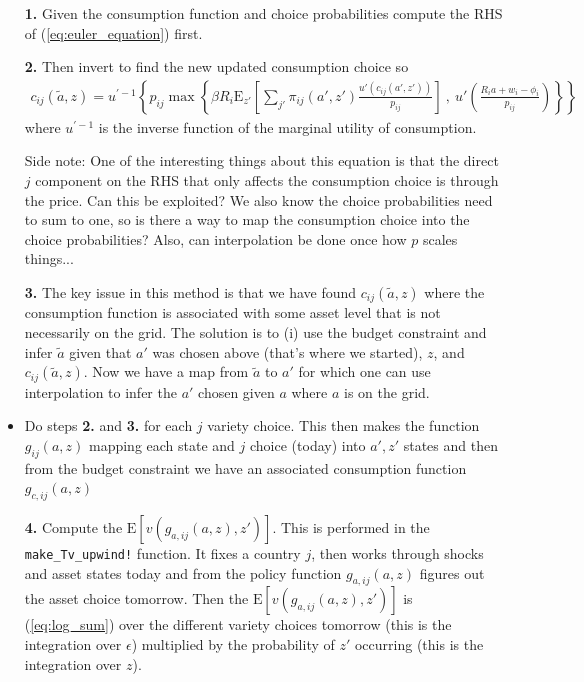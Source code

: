 \documentclass[12pt,pdftex]{article}
\begin{document}
\begin{onehalfspacing}
\begin{itemize}
\item[\textbf{1.}] Given the consumption function and choice probabilities compute the RHS of (\ref{eq:euler_equation}) first.

\item[\textbf{2.}] Then invert to find the new updated consumption choice so
\begin{align}
c_{ij}(\tilde a, z) = u^{' -1}\left\{ p_{ij} \max \left\{ \beta R_{i} \mathrm{E}_{z'} \left[ \sum_{j'} \pi_{ij}(a', z') \frac{u'(c_{ij}(a', z'))}{p_{ij}} \right] \ , \  u' \left( \frac{R_i a + w_i - \phi_{i}}{p_{ij}} \right) \right \} \right \}
\end{align}
where $u^{' -1}$ is the inverse function of the marginal utility of consumption.

Side note: One of the interesting things about this equation is that the direct $j$ component on the RHS that only affects the consumption choice is through the price. Can this be exploited? We also know the choice probabilities need to sum to one, so is there a way to map the consumption choice into the choice probabilities? Also, can interpolation be done once how $p$ scales things...

\item[\textbf{3.}] The key issue in this method is that we have found  $c_{ij}(\tilde a, z)$ where the consumption function is associated with some asset level that is not necessarily on the grid. The solution is to (i) use the budget constraint and infer $\tilde a$ given that $a'$ was chosen above (that's where we started), $z$, and $c_{ij}(\tilde a, z)$. Now we have a map from $\tilde a$ to $a'$ for which one can use interpolation to infer the $a'$ chosen given $a$ where $a$ is on the grid.

\item Do steps \textbf{2.} and \textbf{3.} for each $j$ variety choice. This then makes the function $g_{ij}(a,z)$ mapping each state and $j$ choice (today) into $a', z'$ states and then from the budget constraint we have an associated consumption function $g_{c,ij}(a,z)$

\item[\textbf{4.}] Compute the $\mathrm{E}\left[ v(g_{a,ij}(a,z), z') \right]$. This is performed in the {\tt{make\_Tv\_upwind!}} function. It fixes a country $j$, then works through shocks and asset states today and from the policy function $g_{a,ij}(a,z)$ figures out the asset choice tomorrow. Then the $\mathrm{E}\left[ v(g_{a,ij}(a,z), z') \right]$ is (\ref{eq:log_sum}) over the different variety choices tomorrow (this is the integration over $\epsilon$) multiplied by the probability of $z'$ occurring (this is the integration over $z$).


\end{itemize}
\end{onehalfspacing}
\end{document}
